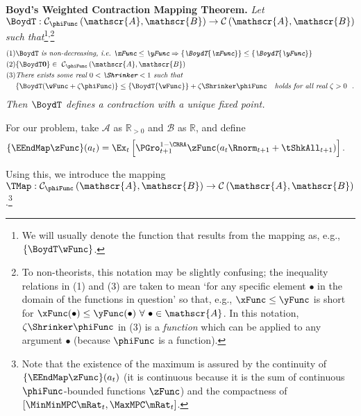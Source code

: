 \documentclass[ProjectDLO]{subfiles}
\begin{document}
\textbf{Boyd's Weighted Contraction Mapping Theorem.} \textit{Let $\BoydT:\mathcal{C}_{\phiFunc }\left( \mathscr{A},\mathscr{B}\right)
  \rightarrow \mathcal{C}\left( \mathscr{A},\mathscr{B}\right) $ such
  that}\footnote{We will usually denote the function that results from the mapping as, e.g., $\{\BoydT\wFunc\}$.}\textsuperscript{,}\footnote{To non-theorists, this notation may be slightly confusing; the inequality relations in (1) and (3) are taken to mean `for any specific element $\bullet$ in the domain of the functions in question' so that, e.g., $\xFunc \leq \yFunc$ is short for $\xFunc(\bullet) \leq \yFunc(\bullet)~\forall~\bullet\in \mathscr{A}$.  In this notation, $\zeta \Shrinker \phiFunc$ in (3) is a \textit{function} which can be applied to any argument $\bullet$ (because $\phiFunc$ is a function).} \nopagebreak
\begin{align*}
  \mbox{(1)} &\BoydT%
               \mbox{ \textit{is non-decreasing, i.e.\ ${\xFunc} \leq {\yFunc}\Rightarrow
               \{\BoydT{\xFunc}\} \leq \{\BoydT{\yFunc}\}$}}   \nonumber \\
  \mbox{(2)} & \{\BoydT\mathbf{0}\}\in ~ \mathcal{C}_{\phiFunc }\left(\mathscr{A},\mathscr{B}\right)  \notag \\
  \mbox{(3)}
             & \mbox{\textit{There exists some real $0 < \Shrinker < 1$ such that}} \\
             & \{\BoydT({\wFunc} +\zeta\phiFunc )\} \leq \{\BoydT{\wFunc}\} +\zeta\Shrinker \phiFunc
               \mbox{ \textit{~~holds for all real $\zeta > 0$ } } .
\end{align*}
\textit{Then $\BoydT$ defines a contraction with a unique fixed point.}

For our problem, take $\mathscr{A}$ as $\mathbb{R}_{>0}$ and $\mathscr{B}$
as $\mathbb{R}$, and define
\begin{align*}
  \{\EEndMap \zFunc\}(a_{t})  & = \Ex_{t}\left[\PGro^{1-\CRRA}_{t+1} \zFunc(a_{t} \Rnorm_{t+1} + \tShkAll_{t+1})\right].
\end{align*}

Using this, we introduce the mapping \textit{$\TMap:\mathcal{C}_{\phiFunc }\left( \mathscr{A},\mathscr{B}\right) \rightarrow \mathcal{C}\left( \mathscr{A},\mathscr{B}\right) $}.\footnote{Note that the existence of the maximum is assured by the continuity of $\{\EEndMap \zFunc\}(a_{t})$ (it is continuous because it is the sum of continuous $\phiFunc$-bounded functions $\zFunc$) and the compactness of $[\MinMinMPC \mRat_{t}, \MaxMPC \mRat_{t}]$.}
\end{document}
